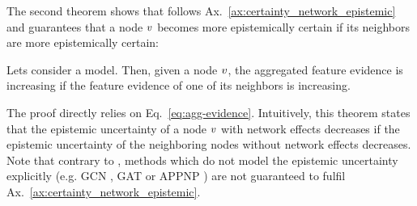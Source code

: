 The second theorem shows that \oursacro{} follows Ax.~\ref{ax:certainty_network_epistemic} and guarantees that a node $v$ becomes more epistemically certain if its neighbors are more epistemically certain:
\begin{theorem}
\label{thm:axiom-network-epistemic}
Lets consider a \oursacro{} model. Then, given a node $v$, the aggregated feature evidence  is increasing if the feature evidence  of one of its neighbors \smash{$\nodeu \in \neighbors(\nodev)$} is increasing.
\end{theorem}
The proof directly relies on Eq.~\ref{eq:agg-evidence}. Intuitively, this theorem states that the epistemic uncertainty  of a node $v$ with network effects decreases if the epistemic uncertainty of the neighboring nodes without network effects decreases. Note that contrary to \oursacro{}, methods which do not model the epistemic uncertainty explicitly (e.g. GCN \cite{Kipf2016}, GAT \citep{Velickovic2017} or APPNP \citep{Klicpera2018}) are not guaranteed to fulfil Ax.~\ref{ax:certainty_network_epistemic}. 

